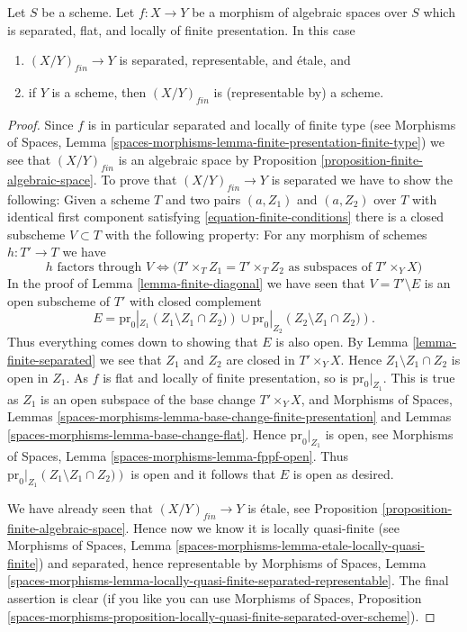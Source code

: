 \begin{lemma}
\label{lemma-finite-separated-flat-locally-finite-presentation}
Let $S$ be a scheme.
Let $f : X \to Y$ be a morphism of algebraic spaces over $S$ which
is separated, flat, and locally of finite presentation.
In this case
\begin{enumerate}
\item $(X/Y)_{fin} \to Y$ is separated, representable, and \'etale, and
\item if $Y$ is a scheme, then $(X/Y)_{fin}$ is (representable by) a scheme.
\end{enumerate}
\end{lemma}

\begin{proof}
Since $f$ is in particular separated and locally of finite type (see
Morphisms of Spaces,
Lemma \ref{spaces-morphisms-lemma-finite-presentation-finite-type})
we see that $(X/Y)_{fin}$ is an algebraic space by
Proposition \ref{proposition-finite-algebraic-space}.
To prove that $(X/Y)_{fin} \to Y$ is separated we have to show
the following: Given a scheme $T$ and two pairs $(a, Z_1)$ and $(a, Z_2)$
over $T$
with identical first component satisfying \ref{equation-finite-conditions}
there is a closed subscheme $V \subset T$ with the following
property: For any morphism of schemes $h : T' \to T$ we have
$$
h \text{ factors through } V \Leftrightarrow
\Big(T' \times_T Z_1 = T' \times_T Z_2
\text{ as subspaces of }T' \times_Y X\Big)
$$
In the proof of
Lemma \ref{lemma-finite-diagonal}
we have seen that $V = T' \setminus E$ is an open subscheme of $T'$
with closed complement
$$
E =
\text{pr}_0|_{Z_1}\left(Z_1 \setminus Z_1 \cap Z_2)\right)
\cup
\text{pr}_0|_{Z_2}\left(Z_2 \setminus Z_1 \cap Z_2)\right).
$$
Thus everything comes down to showing that $E$ is also open. By
Lemma \ref{lemma-finite-separated}
we see that $Z_1$ and $Z_2$ are closed in $T' \times_Y X$. Hence
$Z_1 \setminus Z_1 \cap Z_2$ is open in $Z_1$. As $f$ is flat and
locally of finite presentation, so is $\text{pr}_0|_{Z_1}$.
This is true as $Z_1$ is an open subspace of the base change
$T' \times_Y X$, and
Morphisms of Spaces,
Lemmas \ref{spaces-morphisms-lemma-base-change-finite-presentation} and
Lemmas \ref{spaces-morphisms-lemma-base-change-flat}.
Hence $\text{pr}_0|_{Z_1}$ is open, see
Morphisms of Spaces, Lemma \ref{spaces-morphisms-lemma-fppf-open}.
Thus $\text{pr}_0|_{Z_1}\left(Z_1 \setminus Z_1 \cap Z_2)\right)$ is
open and it follows that $E$ is open as desired.

\medskip\noindent
We have already seen that $(X/Y)_{fin} \to Y$ is \'etale, see
Proposition \ref{proposition-finite-algebraic-space}.
Hence now we know it is locally quasi-finite (see
Morphisms of Spaces,
Lemma \ref{spaces-morphisms-lemma-etale-locally-quasi-finite})
and separated, hence representable by
Morphisms of Spaces, Lemma
\ref{spaces-morphisms-lemma-locally-quasi-finite-separated-representable}.
The final assertion is clear (if you like you can use
Morphisms of Spaces, Proposition
\ref{spaces-morphisms-proposition-locally-quasi-finite-separated-over-scheme}).
\end{proof}

